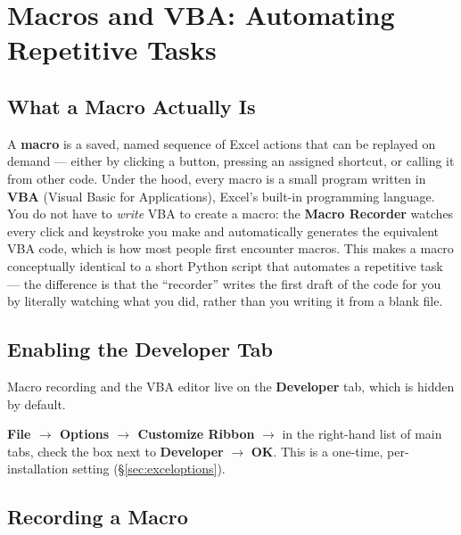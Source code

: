 \documentclass[11pt,a4paper]{article}
\begin{document}
\section{Macros and VBA: Automating Repetitive Tasks}
\label{sec:macros}

\subsection{What a Macro Actually Is}

\begin{keyconcept}
A \textbf{macro} is a saved, named sequence of Excel actions that can be replayed on demand --- either by clicking a button, pressing an assigned shortcut, or calling it from other code. Under the hood, every macro is a small program written in \textbf{VBA} (Visual Basic for Applications), Excel's built-in programming language. You do not have to \emph{write} VBA to create a macro: the \textbf{Macro Recorder} watches every click and keystroke you make and automatically generates the equivalent VBA code, which is how most people first encounter macros. This makes a macro conceptually identical to a short Python script that automates a repetitive task --- the difference is that the ``recorder'' writes the first draft of the code for you by literally watching what you did, rather than you writing it from a blank file.
\end{keyconcept}

\subsection{Enabling the Developer Tab}

Macro recording and the VBA editor live on the \textbf{Developer} tab, which is hidden by default.

\begin{formulasyntax}
\textbf{File $\rightarrow$ Options $\rightarrow$ Customize Ribbon} $\rightarrow$ in the right-hand list of main tabs, check the box next to \textbf{Developer} $\rightarrow$ \textbf{OK}. This is a one-time, per-installation setting (\S\ref{sec:exceloptions}).
\end{formulasyntax}

\subsection{Recording a Macro}
\label{sec:recordmacro}
\end{document}
